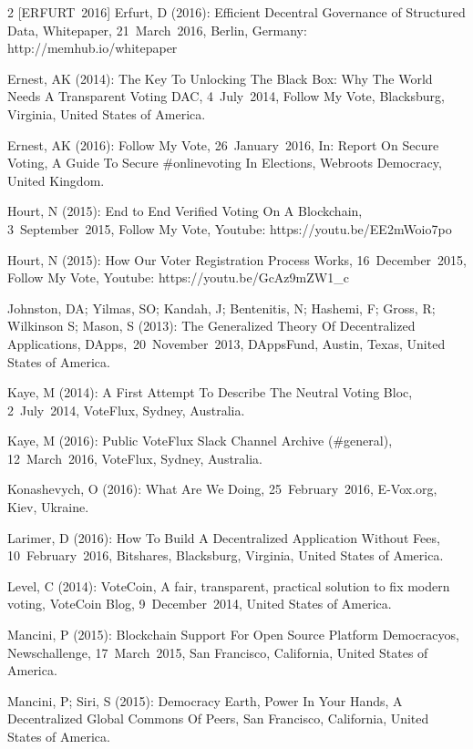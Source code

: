 \documentclass[9pt,oneside]{amsart}
\begin{document}
\begin{multicols}{2}
[ERFURT~2016] Erfurt, D (2016): Efficient Decentral Governance of Structured Data, Whitepaper, 21~March~2016, Berlin, Germany: http://memhub.io/whitepaper\par
[ERNEST~2014] Ernest, AK (2014): The Key To Unlocking The Black Box: Why The World Needs A Transparent Voting DAC, 4~July~2014, Follow My Vote, Blacksburg, Virginia, United States of America.\par
[ERNEST~2016] Ernest, AK (2016): Follow My Vote, 26~January~2016, In: Report On Secure Voting, A Guide To Secure \#onlinevoting In Elections, Webroots Democracy, United Kingdom.\par
[HOURT~2015A] Hourt, N (2015): End to End Verified Voting On A Blockchain, 3~September~2015, Follow My Vote, Youtube: https://youtu.be/EE2mWoio7po\par
[HOURT~2015B] Hourt, N (2015): How Our Voter Registration Process Works, 16~December~2015, Follow My Vote, Youtube: https://youtu.be/GcAz9mZW1\_c\par
[JOHNSTON~et~al.~2013] Johnston, DA; Yilmas, SO; Kandah, J; Bentenitis, N; Hashemi, F; Gross, R; Wilkinson S; Mason, S (2013): The Generalized Theory Of Decentralized Applications, DApps,~20~November~2013, DAppsFund, Austin, Texas, United States of America.\par
[KAYE~2014] Kaye, M (2014): A First Attempt To Describe The Neutral Voting Bloc, 2~July~2014, VoteFlux, Sydney, Australia.\par
[KAYE~2016] Kaye, M (2016): Public VoteFlux Slack Channel Archive (\#general), 12~March~2016, VoteFlux, Sydney, Australia.\par
[KONASHEVYCH~2016] Konashevych, O (2016): What Are We Doing, 25~February~2016, E-Vox.org, Kiev, Ukraine.\par
[LARIMER~2016] Larimer, D (2016): How To Build A Decentralized Application Without Fees, 10~February~2016, Bitshares, Blacksburg, Virginia, United States of America.\par
[LEVEL~2014] Level, C (2014): VoteCoin, A fair, transparent, practical solution to fix modern voting, VoteCoin Blog, 9~December~2014, United States of America.\par
[MANCINI~2015] Mancini, P (2015): Blockchain Support For Open Source Platform Democracyos, Newschallenge, 17~March~2015, San Francisco, California, United States of America.\par
[MANCINI~et~al.~2015] Mancini, P; Siri, S (2015): Democracy Earth, Power In Your Hands, A Decentralized Global Commons Of Peers, San Francisco, California, United States of America.\par

\end{multicols}
\end{document}
